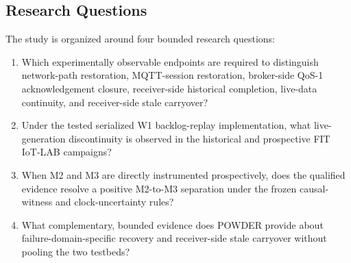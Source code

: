 \documentclass[journal]{IEEEtran}
\begin{document}
\subsection{Research Questions}
The study is organized around four bounded research questions:
\begin{enumerate}
    \item[\textbf{RQ1}] Which experimentally observable endpoints are required to distinguish network-path restoration, MQTT-session restoration, broker-side QoS-1 acknowledgement closure, receiver-side historical completion, live-data continuity, and receiver-side stale carryover?
    \item[\textbf{RQ2}] Under the tested serialized W1 backlog-replay implementation, what live-generation discontinuity is observed in the historical and prospective FIT IoT-LAB campaigns?
    \item[\textbf{RQ3}] When M2 and M3 are directly instrumented prospectively, does the qualified evidence resolve a positive M2-to-M3 separation under the frozen causal-witness and clock-uncertainty rules?
    \item[\textbf{RQ4}] What complementary, bounded evidence does POWDER provide about failure-domain-specific recovery and receiver-side stale carryover without pooling the two testbeds?
\end{enumerate}
\end{document}
